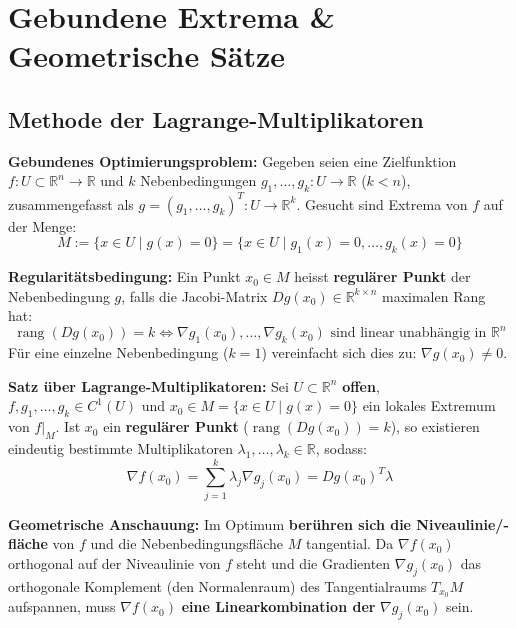 \section{Gebundene Extrema \& Geometrische Sätze}

\subsection{Methode der Lagrange-Multiplikatoren}

\begin{definition}
    \textbf{Gebundenes Optimierungsproblem:} Gegeben seien eine Zielfunktion $f: U \subset \mathbb{R}^n \to \mathbb{R}$ und $k$ Nebenbedingungen $g_1, \dots, g_k: U \to \mathbb{R}$ ($k < n$), zusammengefasst als $g = (g_1, \dots, g_k)^T: U \to \mathbb{R}^k$. Gesucht sind Extrema von $f$ auf der Menge:
    $$ M := \{ x \in U \mid g(x) = 0 \} = \{ x \in U \mid g_1(x) = 0, \dots, g_k(x) = 0 \} $$
\end{definition}

\begin{definition}
    \textbf{Regularitätsbedingung:} Ein Punkt $x_0 \in M$ heisst \textbf{regulärer Punkt} der Nebenbedingung $g$, falls die Jacobi-Matrix $Dg(x_0) \in \mathbb{R}^{k \times n}$ maximalen Rang hat:
    $$ \operatorname{rang}(Dg(x_0)) = k \iff \nabla g_1(x_0), \dots, \nabla g_k(x_0) \text{ sind linear unabhängig in } \mathbb{R}^n $$
    Für eine einzelne Nebenbedingung ($k = 1$) vereinfacht sich dies zu: $\nabla g(x_0) \neq 0$.
\end{definition}

\begin{theorem}
    \textbf{Satz über Lagrange-Multiplikatoren:}
    Sei $U \subset \mathbb{R}^n$ \textbf{offen}, $f, g_1, \dots, g_k \in C^1(U)$ und $x_0 \in M = \{x \in U \mid g(x) = 0\}$ ein lokales Extremum von $f|_M$.
    Ist $x_0$ ein \textbf{regulärer Punkt} ($\operatorname{rang}(Dg(x_0)) = k$), so existieren eindeutig bestimmte Multiplikatoren $\lambda_1, \dots, \lambda_k \in \mathbb{R}$, sodass:
    $$ \nabla f(x_0) = \sum_{j=1}^k \lambda_j \nabla g_j(x_0) = Dg(x_0)^T \lambda $$
\end{theorem}

\begin{remark}
    \textbf{Geometrische Anschauung:}
    Im Optimum \textbf{berühren sich die Niveaulinie/-fläche} von $f$ und die Nebenbedingungsfläche $M$ tangential. Da $\nabla f(x_0)$ orthogonal auf der Niveaulinie von $f$ steht und die Gradienten $\nabla g_j(x_0)$ das orthogonale Komplement (den Normalenraum) des Tangentialraums $T_{x_0} M$ aufspannen, muss $\nabla f(x_0)$ \textbf{eine Linearkombination der} $\nabla g_j(x_0)$ sein.
\end{remark}

